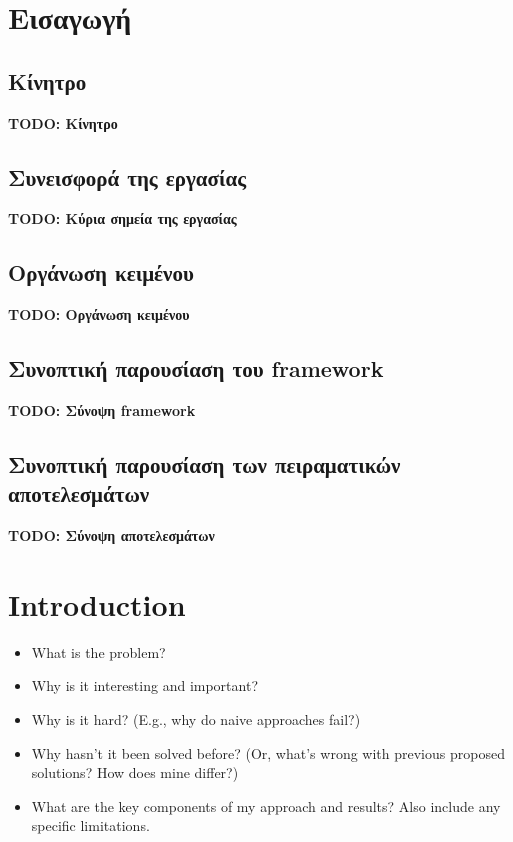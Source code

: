 
\chapter{Εισαγωγή}

\section{Κίνητρο}
  {\color{red}\textbf{TODO: Κίνητρο}}

\section{Συνεισφορά της εργασίας}
  {\color{red}\textbf{TODO: Κύρια σημεία της εργασίας}}

\section{Οργάνωση κειμένου}
  {\color{red}\textbf{TODO: Οργάνωση κειμένου}}

\section{Συνοπτική παρουσίαση του framework}
  {\color{red}\textbf{TODO: Σύνοψη framework}}

\section{Συνοπτική παρουσίαση των πειραματικών αποτελεσμάτων}
  {\color{red}\textbf{TODO: Σύνοψη αποτελεσμάτων}}

\setcounter{chapter}{0}

\chapter{Introduction}

\begin{itemize}
\item What is the problem?
\item Why is it interesting and important?
\item Why is it hard? (E.g., why do naive approaches fail?)
\item Why hasn't it been solved before? (Or, what's wrong with previous proposed solutions? How does mine differ?)
\item What are the key components of my approach and results? Also include any specific limitations.
\end{itemize}

